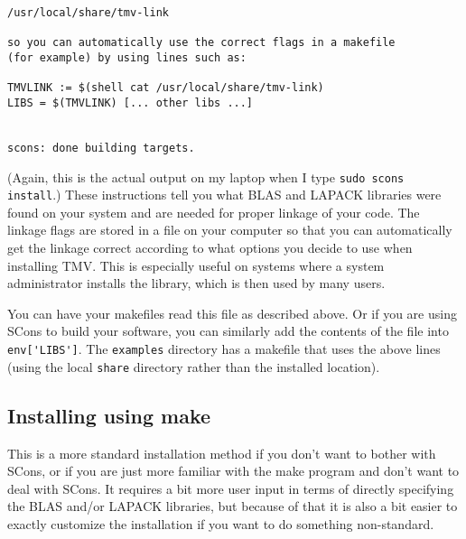 \documentclass[twoside,letterpaper,11pt]{article}
\renewcommand{\tt}[1]{{\lstinline {#1}}}
\begin{document}
\begin{enumerate}
\begin{verbatim}
/usr/local/share/tmv-link

so you can automatically use the correct flags in a makefile
(for example) by using lines such as:

TMVLINK := $(shell cat /usr/local/share/tmv-link)
LIBS = $(TMVLINK) [... other libs ...]


scons: done building targets.
\end{verbatim}
(Again, this is the actual output on my laptop when I type \tt{sudo scons install}.)
These instructions tell you what BLAS and LAPACK libraries were found on your system and 
are needed for proper linkage of your code.  The linkage flags are stored in a file on your
computer so that you can automatically get the linkage correct according to what options
you decide to use when installing TMV.  This is especially useful on systems where a
system administrator installs the library, which is then used by many users.  

You can have your makefiles read this file as described above.  Or if you are using SCons
to build your software, you can similarly add the contents of the file into \tt{env['LIBS']}.
The \tt{examples} directory has a makefile that uses the above lines
(using the local \tt{share} directory rather than the installed location).

\end{enumerate}

\subsection{Installing using make}
\label{Install_Make}
This is a more standard installation method if you don't want to bother with SCons, or if you are just
more familiar with the make program and don't want to deal with SCons.  It requires a bit more
user input in terms of directly specifying the BLAS and/or LAPACK libraries, but because of that
it is also a bit easier to exactly customize the installation if you want to do something non-standard.
\end{document}
